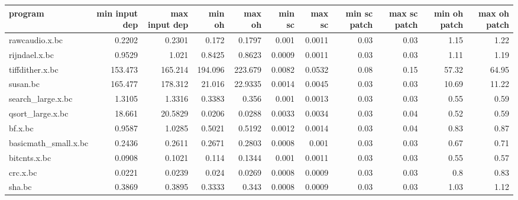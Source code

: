 \begin{tabular}{lrrrrrrrrrr}
\hline
 program              &   min input dep &   max input dep &   min oh &   max oh &   min sc &   max sc &   min sc patch &   max sc patch &   min oh patch &   max oh patch \\
\hline
 rawcaudio.x.bc       &          0.2202 &          0.2301 &   0.172  &   0.1797 &   0.001  &   0.0011 &           0.03 &           0.03 &           1.15 &           1.22 \\
 rijndael.x.bc        &          0.9529 &          1.021  &   0.8425 &   0.8623 &   0.0009 &   0.0011 &           0.03 &           0.03 &           1.11 &           1.19 \\
 tiffdither.x.bc      &        153.473  &        165.214  & 194.096  & 223.679  &   0.0082 &   0.0532 &           0.08 &           0.15 &          57.32 &          64.95 \\
 susan.bc             &        165.477  &        178.312  &  21.016  &  22.9335 &   0.0014 &   0.0045 &           0.03 &           0.03 &          10.69 &          11.22 \\
 search\_large.x.bc    &          1.3105 &          1.3316 &   0.3383 &   0.356  &   0.001  &   0.0013 &           0.03 &           0.03 &           0.55 &           0.59 \\
 qsort\_large.x.bc     &         18.661  &         20.5829 &   0.0206 &   0.0288 &   0.0033 &   0.0034 &           0.03 &           0.04 &           0.52 &           0.59 \\
 bf.x.bc              &          0.9587 &          1.0285 &   0.5021 &   0.5192 &   0.0012 &   0.0014 &           0.03 &           0.04 &           0.83 &           0.87 \\
 basicmath\_small.x.bc &          0.2436 &          0.2611 &   0.2671 &   0.2803 &   0.0008 &   0.001  &           0.03 &           0.03 &           0.67 &           0.71 \\
 bitcnts.x.bc         &          0.0908 &          0.1021 &   0.114  &   0.1344 &   0.001  &   0.0011 &           0.03 &           0.03 &           0.55 &           0.57 \\
 crc.x.bc             &          0.0221 &          0.0239 &   0.024  &   0.0269 &   0.0008 &   0.0009 &           0.03 &           0.03 &           0.8  &           0.83 \\
 sha.bc               &          0.3869 &          0.3895 &   0.3333 &   0.343  &   0.0008 &   0.0009 &           0.03 &           0.03 &           1.03 &           1.12 \\

\end{tabular}
